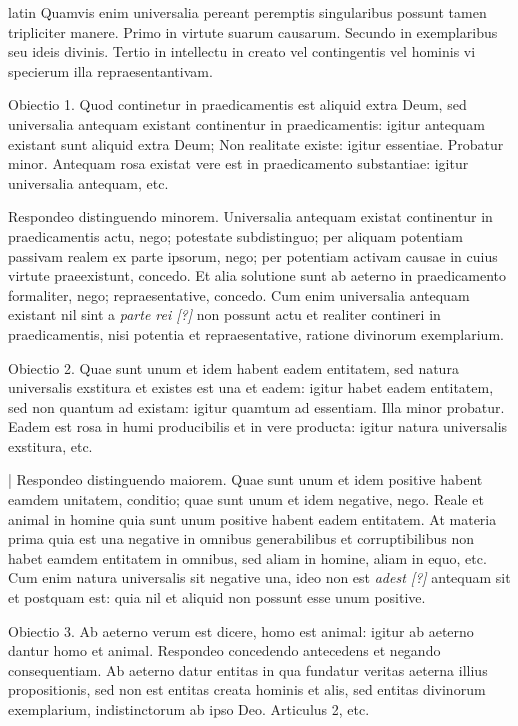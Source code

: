 \begin{otherlanguage*}{latin}
\pstart
  Quamvis enim universalia pereant peremptis singularibus possunt tamen tripliciter manere. Primo in virtute suarum causarum. Secundo in exemplaribus seu ideis divinis. Tertio in intellectu in creato vel contingentis vel hominis vi specierum illa repraesentantivam. 
\pend

\pstart
  Obiectio 1. Quod continetur in praedicamentis est aliquid extra Deum, sed universalia antequam existant continentur in praedicamentis: igitur antequam existant sunt aliquid extra Deum; Non realitate existe: igitur essentiae. Probatur minor. Antequam rosa existat vere est in praedicamento substantiae: igitur universalia antequam, etc. 
\pend

\pstart
  Respondeo distinguendo minorem. Universalia antequam existat continentur in praedicamentis actu, nego; potestate subdistinguo; per aliquam potentiam passivam realem ex parte ipsorum, nego; per potentiam activam causae in cuius virtute praeexistunt, concedo. Et alia solutione sunt ab aeterno in praedicamento formaliter, nego; repraesentative, concedo. Cum enim universalia antequam existant nil sint a \emph{parte rei [?]} non possunt actu et realiter contineri in praedicamentis, nisi potentia et repraesentative, ratione divinorum exemplarium. 
\pend

\pstart
  Obiectio 2. Quae sunt unum et idem habent eadem entitatem, sed natura universalis exstitura et existes est una et eadem: igitur habet eadem entitatem, sed non quantum ad existam: igitur quamtum ad essentiam. Illa minor probatur. Eadem est rosa in humi producibilis et in vere producta: igitur natura universalis exstitura, etc. 
\pend

\pstart
  \textnormal{|} Respondeo distinguendo maiorem. Quae sunt unum et idem positive habent eamdem unitatem, conditio; quae sunt unum et idem negative, nego. Reale et animal in homine quia sunt unum positive habent eadem entitatem. At materia prima quia est una negative in omnibus generabilibus et corruptibilibus non habet eamdem entitatem in omnibus, sed aliam in homine, aliam in equo, etc. Cum enim natura universalis sit negative una, ideo non est \emph{adest [?]} antequam sit et postquam est: quia nil et aliquid non possunt esse unum positive. 
\pend

\pstart
  Obiectio 3. Ab aeterno verum est dicere, homo est animal: igitur ab aeterno dantur homo et animal. Respondeo concedendo antecedens et negando consequentiam. Ab aeterno datur entitas in qua fundatur veritas aeterna illius propositionis, sed non est entitas creata hominis et alis, sed entitas divinorum exemplarium, indistinctorum ab ipso Deo. Articulus 2, etc. 
\pend


\end{otherlanguage*}
